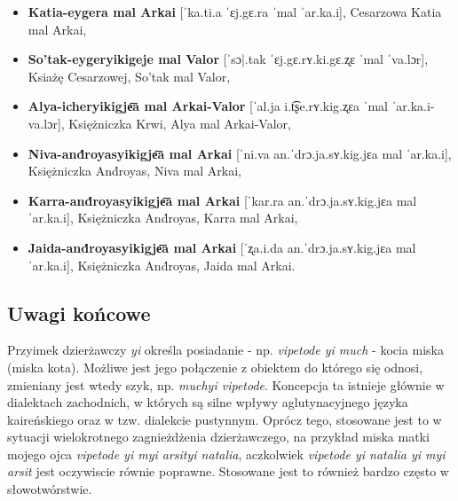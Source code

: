 \begin{itemize}
\item \textbf{Katia-eygera mal Arkai} [ˈka.ti.a ˈɛj.gɛ.ra ˈmal ˈar.ka.i], 
Cesarzowa Katia mal Arkai,
\item \textbf{So'tak-eygeryikigeje mal Valor} [ˈsɔ|.tak ˈɛj.gɛ.rʏ.ki.gɛ.ʐɛ 
ˈmal ˈva.lɔr], Ksiażę Cesarzowej, So'tak mal Valor,
\item \textbf{Alya-icheryikigje͞a mal Arkai-Valor} [ˈal.ja i.t͡ʂe.rʏ.kig.ʐɛa ˈmal 
ˈar.ka.i-va.lɔr], Księżniczka Krwi, Alya mal Arkai-Valor,
\item \textbf{Niva-and́royasyikigje͞a mal Arkai} [ˈni.va an.ˈdrɔ.ja.sʏ.kig.jɛa 
mal ˈar.ka.i], Księżniczka And́royas, Niva mal Arkai,
\item \textbf{Karra-and́royasyikigje͞a mal Arkai} [ˈkar.ra an.ˈdrɔ.ja.sʏ.kig.jɛa 
mal ˈar.ka.i], Księżniczka And́royas, Karra mal Arkai,
\item \textbf{Jaida-and́royasyikigje͞a mal Arkai} [ˈʐa.i.da an.ˈdrɔ.ja.sʏ.kig.jɛa
mal ˈar.ka.i], Księżniczka And́royas, Jaida mal Arkai.
\end{itemize}




\subsection{Uwagi końcowe}

Przyimek dzierżawczy \emph{yi} określa posiadanie - np. \emph{vipetode yi much}
- kocia miska (miska kota). Możliwe jest jego połączenie z obiektem do którego 
się odnosi, zmieniany jest wtedy szyk, np. \emph{muchyi vipetode}. Koncepcja ta 
istnieje głównie w dialektach zachodnich, w których są silne wpływy 
aglutynacyjnego języka kaireńskiego oraz w tzw. dialekcie pustynnym. Oprócz 
tego, stosowane jest to w sytuacji wielokrotnego zagnieżdżenia dzierżawczego, 
na przykład miska matki mojego ojca \emph{vipetode yi myi arsityi natalia}, 
aczkolwiek \emph{vipetode yi natalia yi myi arsit} jest oczywiscie równie 
poprawne. Stosowane jest to również bardzo często w słowotwórstwie.
